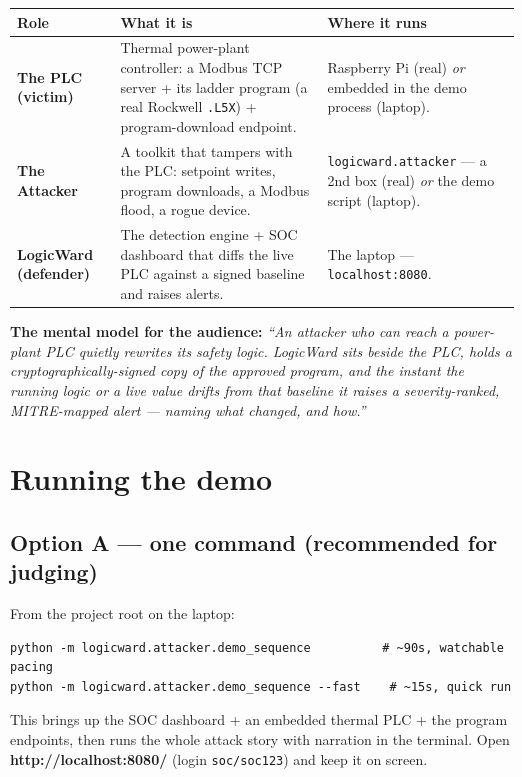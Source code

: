 \documentclass[11pt,a4paper]{article}
\newcommand{\code}[1]{\texttt{\small #1}}
\begin{document}
\begin{tabularx}{\textwidth}{@{}p{3.1cm} L p{4.4cm}@{}}
\toprule
\textbf{Role} & \textbf{What it is} & \textbf{Where it runs} \\
\midrule
\textbf{The PLC (victim)} & Thermal power-plant controller: a Modbus TCP server + its
  ladder program (a real Rockwell \code{.L5X}) + program-download endpoint. &
  Raspberry Pi (real) \emph{or} embedded in the demo process (laptop). \\
\addlinespace
\textbf{The Attacker} & A toolkit that tampers with the PLC: setpoint writes, program
  downloads, a Modbus flood, a rogue device. & \code{logicward.attacker} --- a 2nd box
  (real) \emph{or} the demo script (laptop). \\
\addlinespace
\textbf{LogicWard (defender)} & The detection engine + SOC dashboard that diffs the live
  PLC against a signed baseline and raises alerts. & The laptop --- \code{localhost:8080}. \\
\bottomrule
\end{tabularx}

\begin{note}
\textbf{The mental model for the audience:} \emph{``An attacker who can reach a power-plant
PLC quietly rewrites its safety logic. LogicWard sits beside the PLC, holds a
cryptographically-signed copy of the approved program, and the instant the running logic
or a live value drifts from that baseline it raises a severity-ranked, MITRE-mapped
alert --- naming what changed, and how.''}
\end{note}

\section{Running the demo}

\subsection{Option A --- one command (recommended for judging)}
From the project root on the laptop:
\begin{lstlisting}
python -m logicward.attacker.demo_sequence          # ~90s, watchable pacing
python -m logicward.attacker.demo_sequence --fast    # ~15s, quick run
\end{lstlisting}
This brings up the SOC dashboard + an embedded thermal PLC + the program endpoints, then
runs the whole attack story with narration in the terminal. Open
\textbf{http://localhost:8080/} (login \code{soc/soc123}) and keep it on screen.
\end{document}
